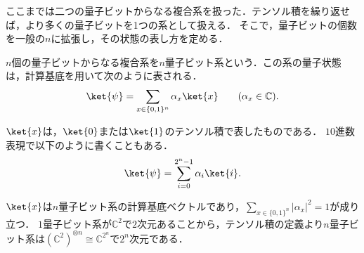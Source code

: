ここまでは二つの量子ビットからなる複合系を扱った．テンソル積を繰り返せば，より多くの量子ビットを1つの系として扱える．
そこで，量子ビットの個数を一般の$n$に拡張し，その状態の表し方を定める．
\begin{defi}[$n$量子ビット系]
  $n$個の量子ビットからなる複合系を$n$量子ビット系という．この系の量子状態は，計算基底を用いて次のように表される．
  \begin{equation*}
    \ket{\psi}=\sum_{x\in\{0,1\}^n}\alpha_x\ket{x}
    \qquad (\alpha_x\in\mathbb C).
  \end{equation*}
\end{defi}
$\ket{x}$は，$\ket{0}$または$\ket{1}$のテンソル積で表したものである．
$10$進数表現で以下のように書くこともある．
\[
  \ket{\psi} = \sum_{i=0}^{2^n-1}\alpha_i\ket{i}.
\]

$\ket{x}$は$n$量子ビット系の計算基底ベクトルであり，$\sum_{x\in\{0,1\}^n}|\alpha_x|^2=1$が成り立つ．
$1$量子ビット系が$\mathbb{C}^2$で$2$次元あることから，テンソル積の定義より$n$量子ビット系は$(\mathbb{C}^2)^{\otimes n} \cong \mathbb{C}^{2^{n}}$で$2^n$次元である．

